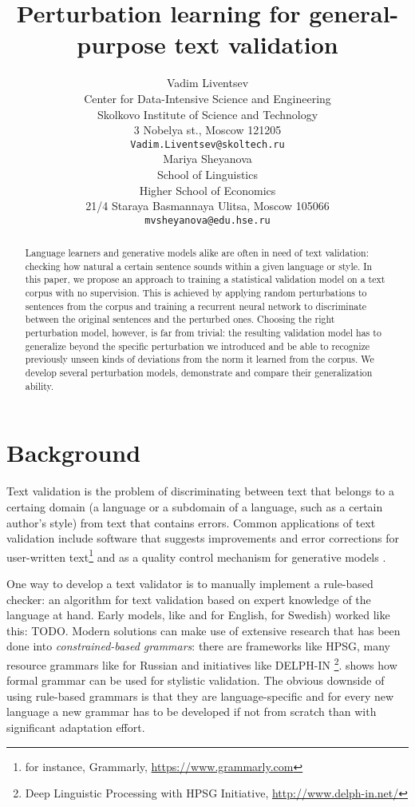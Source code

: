 \documentclass[11pt,a4paper]{article}
\title{Perturbation learning for general-purpose text validation}
\author{Vadim Liventsev \\
  Center for Data-Intensive Science and Engineering \\
  Skolkovo Institute of Science and Technology\\
  3 Nobelya st., Moscow 121205 \\
  {\tt Vadim.Liventsev@skoltech.ru} \\\And
  Mariya Sheyanova \\
  School of Linguistics \\
  Higher School of Economics \\
  21/4 Staraya Basmannaya Ulitsa, Moscow 105066 \\
  {\tt mvsheyanova@edu.hse.ru} \\}
\date{}
\begin{document}
\maketitle
\begin{abstract}
  Language learners and generative models alike are often in need of text validation: checking how natural a certain sentence sounds within a given language or style.
  In this paper, we propose an approach to training a statistical validation model on a text corpus with no supervision.
  This is achieved by applying random perturbations to sentences from the corpus and training a recurrent neural network to discriminate between the original sentences and the perturbed ones.
  Choosing the right perturbation model, however, is far from trivial: the resulting validation model has to generalize beyond the specific perturbation we introduced and be able to recognize previously unseen kinds of deviations from the norm it learned from the corpus.
  We develop several perturbation models, demonstrate and compare their generalization ability.
\end{abstract}

\section{Background}
\label{sec:background}

Text validation is the problem of discriminating between text that belongs to a certaing domain (a language or a subdomain of a language, such as a certain author's style) from text that contains errors. 
Common applications of text validation include software that suggests improvements and error corrections for user-written text\footnote{for instance, Grammarly, \url{https://www.grammarly.com}} and as a quality control mechanism for generative models \cite{eval-genmodels}.

One way to develop a text validator is to manually implement a rule-based checker: an algorithm for text validation based on expert knowledge of the language at hand.
Early models, like \citet{easyenglish} and \citet{english-checker} for English, \citet{swedish-checker} for Swedish) worked like this: TODO. 
Modern solutions can make use of extensive research that has been done into \emph{constrained-based grammars}: there are frameworks like HPSG, many resource grammars like \cite{russian-grammar} for Russian and initiatives like DELPH-IN \footnote{Deep Linguistic Processing with HPSG Initiative, \url{http://www.delph-in.net/}}.
\citet{grammar-for-stylistics} shows how formal grammar can be used for stylistic validation. 
The obvious downside of using rule-based grammars is that they are language-specific and for every new language a new grammar has to be developed if not from scratch than with significant adaptation effort.
\end{document}
